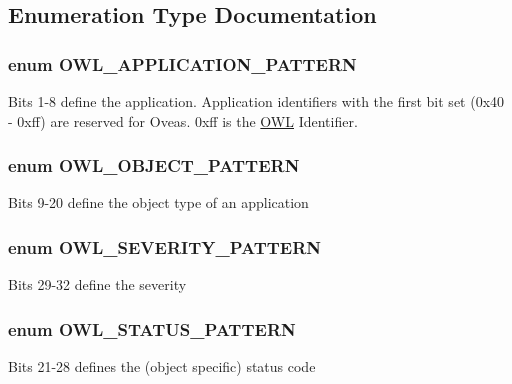 \subsection{Enumeration Type Documentation}
\hypertarget{class_8register_8php_22359c406b8745e8fa2412ec96d5e74c}{
\subsubsection{\setlength{\rightskip}{0pt plus 5cm}enum {\bf OWL\_\-APPLICATION\_\-PATTERN}}}
\label{class_8register_8php_22359c406b8745e8fa2412ec96d5e74c}


Bits 1-8 define the application. Application identifiers with the first bit set (0x40 - 0xff) are reserved for Oveas. 0xff is the \hyperlink{classOWL}{OWL} Identifier. \hypertarget{class_8register_8php_ac5ed52fb1bbffdff69e9a24c40962f5}{
\subsubsection{\setlength{\rightskip}{0pt plus 5cm}enum {\bf OWL\_\-OBJECT\_\-PATTERN}}}
\label{class_8register_8php_ac5ed52fb1bbffdff69e9a24c40962f5}


Bits 9-20 define the object type of an application \hypertarget{class_8register_8php_eb9363fcaa1cd911762ff88518a9d973}{
\subsubsection{\setlength{\rightskip}{0pt plus 5cm}enum {\bf OWL\_\-SEVERITY\_\-PATTERN}}}
\label{class_8register_8php_eb9363fcaa1cd911762ff88518a9d973}


Bits 29-32 define the severity \hypertarget{class_8register_8php_0a8649e9ad7fa654df2c41aa4ba1283c}{
\subsubsection{\setlength{\rightskip}{0pt plus 5cm}enum {\bf OWL\_\-STATUS\_\-PATTERN}}}
\label{class_8register_8php_0a8649e9ad7fa654df2c41aa4ba1283c}


Bits 21-28 defines the (object specific) status code 